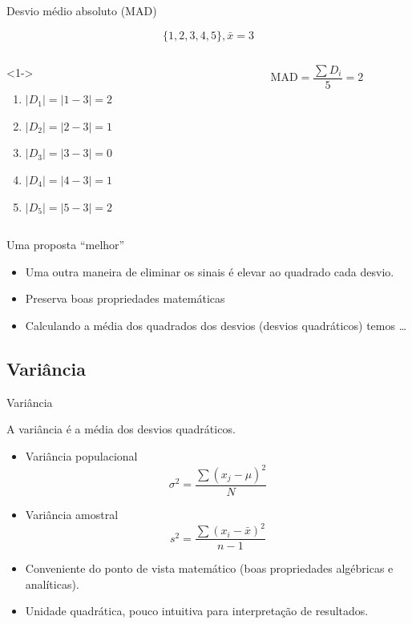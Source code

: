 \documentclass{beamer}
\begin{document}
\begin{frame}{Desvio médio absoluto (MAD)}
  \begin{example}
  \begin{displaymath}
    \{1,2,3,4,5\}, \bar{x} = 3
  \end{displaymath}
  \begin{columns}
    \begin{column}{5cm}<1->
      \begin{enumerate}
      \item $|D_1| = |1-3| = 2$
      \item $|D_2| = |2-3| = 1$
      \item $|D_3| = |3-3| = 0$
      \item $|D_4| = |4-3| = 1$
      \item $|D_5| = |5-3| = 2$
      \end{enumerate}
    \end{column}
    \begin{column}{5cm}
      \begin{displaymath}
        \mathrm{MAD } = \frac{\sum D_i}{5} = 2
      \end{displaymath}
    \end{column}
  \end{columns}
  \end{example}
\end{frame}

\begin{frame}{Uma proposta ``melhor''}
  \begin{itemize}
  \item Uma outra maneira de eliminar os sinais é elevar ao quadrado
    cada desvio.
  \item Preserva boas propriedades matemáticas
  \item Calculando a média dos quadrados dos desvios (desvios
    quadráticos) temos \ldots
  \end{itemize}
\end{frame}

\subsection{Variância}
\begin{frame}{Variância}
  \begin{definition}
    A variância é a média dos desvios quadráticos.
  \end{definition}
  \begin{itemize}
  \item Variância populacional
$$\sigma^2 = \frac{\sum (x_j - \mu)^2}{N}$$
\item Variância amostral
$$s^2 = \frac{\sum (x_i - \bar{x})^2}{n-1}$$
\item Conveniente do ponto de vista matemático (boas propriedades
  algébricas e analíticas).
\item Unidade quadrática, pouco intuitiva para interpretação de
  resultados.
  \end{itemize}
\end{frame}
\end{document}
